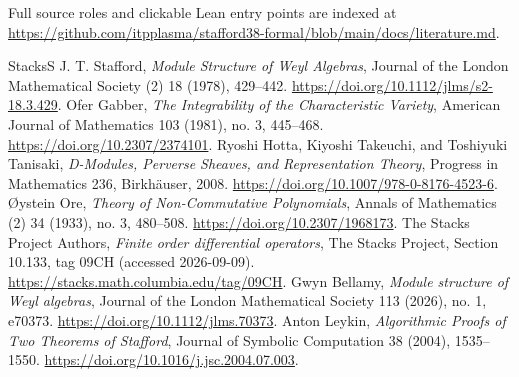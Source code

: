 \documentclass[11pt,a4paper]{article}
\theoremstyle{definition}
\theoremstyle{plain}
\begin{document}
Full source roles and clickable Lean entry points are indexed at \url{https://github.com/itpplasma/stafford38-formal/blob/main/docs/literature.md}.

\begin{thebibliography}{StacksS}
 J. T. Stafford, \emph{Module Structure of Weyl Algebras}, Journal of the London Mathematical Society (2) 18 (1978), 429–442. \url{https://doi.org/10.1112/jlms/s2-18.3.429}.
 Ofer Gabber, \emph{The Integrability of the Characteristic Variety}, American Journal of Mathematics 103 (1981), no. 3, 445–468. \url{https://doi.org/10.2307/2374101}.
 Ryoshi Hotta, Kiyoshi Takeuchi, and Toshiyuki Tanisaki, \emph{D-Modules, Perverse Sheaves, and Representation Theory}, Progress in Mathematics 236, Birkhäuser, 2008. \url{https://doi.org/10.1007/978-0-8176-4523-6}.
 {\O}ystein Ore, \emph{Theory of Non-Commutative Polynomials}, Annals of Mathematics (2) 34 (1933), no. 3, 480–508. \url{https://doi.org/10.2307/1968173}.
 The Stacks Project Authors, \emph{Finite order differential operators}, The Stacks Project, Section 10.133, tag 09CH (accessed 2026-09-09). \url{https://stacks.math.columbia.edu/tag/09CH}.
 Gwyn Bellamy, \emph{Module structure of Weyl algebras}, Journal of the London Mathematical Society 113 (2026), no. 1, e70373. \url{https://doi.org/10.1112/jlms.70373}.
 Anton Leykin, \emph{Algorithmic Proofs of Two Theorems of Stafford}, Journal of Symbolic Computation 38 (2004), 1535–1550. \url{https://doi.org/10.1016/j.jsc.2004.07.003}.
\end{thebibliography}
\end{document}

